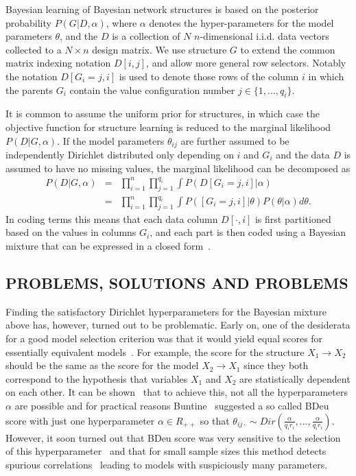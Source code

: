 Bayesian learning of Bayesian network structures is based on the
posterior probability $P(G|D,\alpha)$, where $\alpha$ denotes the
hyper\nobreakdash-parameters for the model parameters $\theta$, and
the $D$ is a collection of $N$ $n$\nobreakdash-dimensional i.i.d. data
vectors collected to a $N\times n$ design matrix.  We use structure
$G$ to extend the common matrix indexing notation $D[i,j]$, and allow
more general row selectors.  Notably the notation $D[G_i=j,i]$ is used
to denote those rows of the column $i$ in which the parents $G_i$
contain the value configuration number $j\in\{1,\ldots,q_i\}$.

It is common to assume the uniform prior for structures, in which case
the objective function for structure learning is reduced to the
marginal likelihood $P(D|G,\alpha)$.  If the model parameters
$\theta_{ij}$ are further assumed to be independently Dirichlet
distributed only depending on $i$ and $G_{i}$ and the data $D$ is
assumed to have no missing values, the marginal likelihood can be
decomposed as
\begin{eqnarray}
\label{eqn:bayesmix}
P(D|G,\alpha) & = & \prod_{i=1}^{n}\prod_{j=1}^{q_i}\int
P(D[G_i=j,i]|\alpha)\\ & = & \prod_{i=1}^{n}\prod_{j=1}^{q_i}\int
P([G_i=j,i]|\theta)P(\theta|\alpha) d\theta.\nonumber
\end{eqnarray}
In coding terms this means that each data column $D[\cdot,i]$ is first partitioned based on the
values in columns $G_i$, and each part is then coded using a Bayesian mixture that can be expressed
in a closed form~\cite{Bunt91, Heck95}.

\subsection {PROBLEMS, SOLUTIONS AND PROBLEMS}

Finding the satisfactory Dirichlet hyperparameters for the Bayesian
mixture above has, however, turned out to be problematic. Early on,
one of the desiderata for a good model selection criterion was that it
would yield equal scores for essentially equivalent
models~\cite{Verm90}.  For example, the score for the structure
$X_1\rightarrow X_2$ should be the same as the score for the model
$X_2 \rightarrow X_1$ since they both correspond to the hypothesis
that variables $X_1$ and $X_2$ are statistically dependent on each
other.  It can be shown~\cite{Heck95} that to achieve this, not all
the hyperparameters $\alpha$ are possible and for practical reasons
Buntine~\cite{Bunt91} suggested a so called BDeu score with just one
hyperparameter $\alpha\in R_{++}$ so that $\theta_{ij\cdot}\sim
Dir(\frac{\alpha}{q_i r_i},\ldots,\frac{\alpha}{q_i r_i})$.  However,
it soon turned out that BDeu score was very sensitive to the selection
of this hyperparameter~\cite{cosco.uai07} and that for small sample
sizes this method detects spurious correlations~\cite{Steck08} leading
to models with suspiciously many parameters. 

